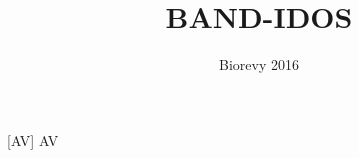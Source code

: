 \documentclass[a4paper,11pt]{article}
\title{BAND-IDOS}
\author{Biorevy 2016}
\begin{document}
\maketitle

\begin{roles}
    [AV] AV
\end{roles}

\begin{sketch}


\end{sketch}
\end{document}
